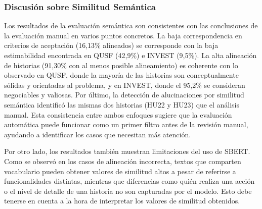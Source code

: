 




\subsubsection{Discusión sobre Similitud Semántica}
Los resultados de la evaluación semántica son consistentes con las conclusiones de la evaluación manual en varios puntos concretos. La baja correspondencia en criterios de aceptación (16,13\% alineados) se corresponde con la baja estimabilidad encontrada en QUSF (42,9\%) e INVEST (9,5\%). La alta alineación de historias (91,30\% con al menos posible alineamiento) es coherente con lo observado en QUSF, donde la mayoría de las historias son conceptualmente sólidas y orientadas al problema, y en INVEST, donde el 95,2\% se consideran negociables y valiosas. Por último, la detección de alucinaciones por similitud semántica identificó las mismas dos historias (HU22 y HU23) que el análisis manual. Esta consistencia entre ambos enfoques sugiere que la evaluación automática puede funcionar como un primer filtro antes de la revisión manual, ayudando a identificar los casos que necesitan más atención.

Por otro lado, los resultados también muestran limitaciones del uso de SBERT. Como se observó en los casos de alineación incorrecta, textos que comparten vocabulario pueden obtener valores de similitud altos a pesar de referirse a funcionalidades distintas, mientras que diferencias como quién realiza una acción o el nivel de detalle de una historia no son capturadas por el modelo. Esto debe tenerse en cuenta a la hora de interpretar los valores de similitud obtenidos.

